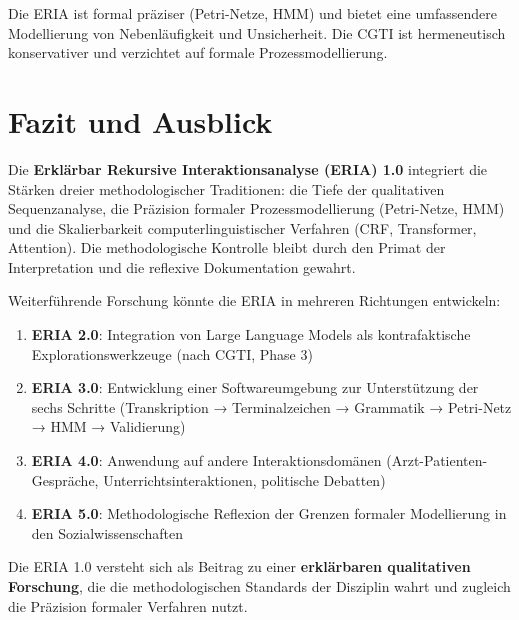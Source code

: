 \documentclass[12pt,a4paper]{article}
\begin{document}
Die ERIA ist formal präziser (Petri-Netze, HMM) und bietet eine umfassendere 
Modellierung von Nebenläufigkeit und Unsicherheit. Die CGTI ist hermeneutisch 
konservativer und verzichtet auf formale Prozessmodellierung.

\section{Fazit und Ausblick}

Die \textbf{Erklärbar Rekursive Interaktionsanalyse (ERIA) 1.0} integriert die 
Stärken dreier methodologischer Traditionen: die Tiefe der qualitativen Sequenzanalyse, 
die Präzision formaler Prozessmodellierung (Petri-Netze, HMM) und die Skalierbarkeit 
computerlinguistischer Verfahren (CRF, Transformer, Attention). Die methodologische 
Kontrolle bleibt durch den Primat der Interpretation und die reflexive Dokumentation 
gewahrt.

Weiterführende Forschung könnte die ERIA in mehreren Richtungen entwickeln:

\begin{enumerate}
    \item \textbf{ERIA 2.0}: Integration von Large Language Models als 
    kontrafaktische Explorationswerkzeuge (nach CGTI, Phase 3)
    
    \item \textbf{ERIA 3.0}: Entwicklung einer Softwareumgebung zur Unterstützung 
    der sechs Schritte (Transkription → Terminalzeichen → Grammatik → Petri-Netz 
    → HMM → Validierung)
    
    \item \textbf{ERIA 4.0}: Anwendung auf andere Interaktionsdomänen (Arzt-Patienten-Gespräche, 
    Unterrichtsinteraktionen, politische Debatten)
    
    \item \textbf{ERIA 5.0}: Methodologische Reflexion der Grenzen formaler 
    Modellierung in den Sozialwissenschaften
\end{enumerate}

Die ERIA 1.0 versteht sich als Beitrag zu einer \textbf{erklärbaren qualitativen 
Forschung}, die die methodologischen Standards der Disziplin wahrt und zugleich 
die Präzision formaler Verfahren nutzt.
\end{document}
